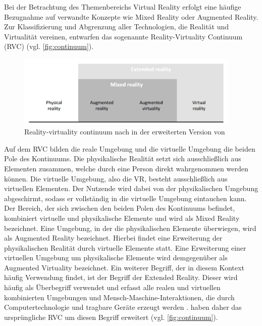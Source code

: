 Bei der Betrachtung des Themenbereichs Virtual Reality erfolgt eine häufige Bezugnahme auf verwandte Konzepte wie Mixed Reality oder Augmented Reality. Zur Klassifizierung und Abgrenzung aller Technologien, die Realität und Virtualität vereinen, entwarfen \citet{10.1117/12.197321} das sogenannte Reality-Virtuality Continuum (RVC) (vgl. \autoref{fig:continuum}). 

\begin{figure}[tbh]
    \centering
    \includegraphics[width=0.95\textwidth]{images/Mixed-Reality-Cont-NEW.png}
    \caption{Reality-virtuality continuum nach \cite{10.1117/12.197321} in der erweiterten Version von \cite{wohlgenannt_virtual_2020}}
    \label{fig:continuum}
\end{figure}


Auf dem RVC bilden die reale Umgebung und die virtuelle
Umgebung die beiden Pole des Kontinuums. Die physikalische Realität setzt sich ausschließlich aus Elementen zusammen, welche durch eine Person direkt wahrgenommen werden können. Die virtuelle Umgebung, also die VR, besteht ausschließlich aus virtuellen Elementen. Der Nutzende wird dabei von der physikalischen Umgebung abgeschirmt, sodass er vollständig in die virtuelle Umgebung eintauchen kann. Der Bereich, der sich zwischen den beiden Polen des Kontinuums befindet, kombiniert virtuelle und physikalische Elemente und wird als Mixed Reality bezeichnet. Eine Umgebung, in der die physikalischen Elemente überwiegen, wird als Augmented Reality bezeichnet. Hierbei findet eine Erweiterung der physikalischen Realität durch virtuelle Elemente statt. Eine Erweiterung einer virtuellen Umgebung um physikalische Elemente wird demgegenüber als Augmented Virtuality bezeichnet. 
Ein weiterer Begriff, der in diesem Kontext häufig Verwendung findet, ist der Begriff der Extended Reality. Dieser wird häufig als Überbegriff verwendet und erfasst alle realen und virtuellen kombinierten Umgebungen und Mensch-Maschine-Interaktionen, die durch Computertechnologie und tragbare Geräte erzeugt werden \citep{fast-berglund_testing_2018}. \citet{wohlgenannt_virtual_2020} haben daher das ursprüngliche RVC um diesen Begriff erweitert (vgl. \autoref{fig:continuum}). 
 
